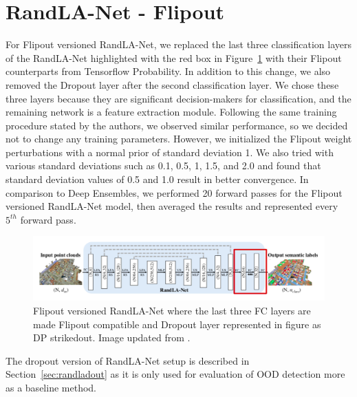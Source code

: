     \section{RandLA-Net - Flipout}
    \label{sec:flipout_setup}
    For Flipout versioned RandLA-Net, we replaced the last three classification layers of the RandLA-Net highlighted with the red box in Figure~\ref{fig:fout_randlanet} with their Flipout counterparts from Tensorflow Probability.
    In addition to this change, we also removed the Dropout layer after the second classification layer.
    We chose these three layers because they are significant decision-makers for classification, and the remaining network is a feature extraction module.
    Following the same training procedure stated by the authors, we observed similar performance, so we decided not to change any training parameters.
    However, we initialized the Flipout weight perturbations with a normal prior of standard deviation 1.
    We also tried with various standard deviations such as 0.1, 0.5, 1, 1.5, and 2.0 and found that standard deviation values of 0.5 and 1.0 result in better convergence.
    In comparison to Deep Ensembles, we performed 20 forward passes for the Flipout versioned RandLA-Net model, then averaged the results and represented every $5^{th}$ forward pass.
    \begin{figure}
        \centering
        \includegraphics[scale=0.42]{images/fout_randlanet.png}
        \caption{Flipout versioned RandLA-Net where the last three FC layers are made Flipout compatible and Dropout layer represented in figure as DP strikedout. Image updated from \cite{Hu_2020_CVPR_Randla}.}
        \label{fig:fout_randlanet}
    \end{figure}
    The dropout version of RandLA-Net setup is described in Section~\ref{sec:randladout} as it is only used for evaluation of OOD detection more as a baseline method.

